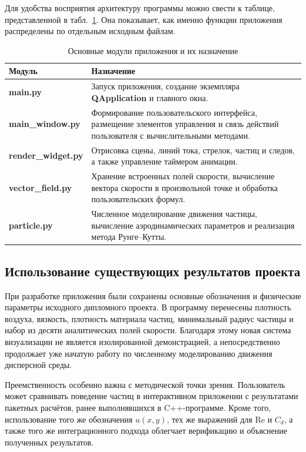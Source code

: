 \documentclass[14pt,a4paper]{extarticle}
\numberwithin{figure}{section}
\numberwithin{table}{section}
\begin{document}
Для удобства восприятия архитектуру программы можно свести к таблице,
представленной в табл.~\ref{tab:modules}. Она показывает, как именно функции
приложения распределены по отдельным исходным файлам.

\begin{table}[!htbp]
\centering
\caption{Основные модули приложения и их назначение}
\label{tab:modules}
\begin{tabular}{|p{4cm}|p{9.2cm}|}
\hline
\textbf{Модуль} & \textbf{Назначение} \\
\hline
\textbf{main.py} & Запуск приложения, создание экземпляра \textbf{QApplication} и главного окна. \\
\hline
\textbf{main\_window.py} & Формирование пользовательского интерфейса, размещение элементов управления и связь действий пользователя с вычислительными методами. \\
\hline
\textbf{render\_widget.py} & Отрисовка сцены, линий тока, стрелок, частиц и следов, а также управление таймером анимации. \\
\hline
\textbf{vector\_field.py} & Хранение встроенных полей скорости, вычисление вектора скорости в произвольной точке и обработка пользовательских формул. \\
\hline
\textbf{particle.py} & Численное моделирование движения частицы, вычисление аэродинамических параметров и реализация метода Рунге--Кутты. \\
\hline
\end{tabular}
\end{table}

\subsection{Использование существующих результатов проекта}

При разработке приложения были сохранены основные обозначения и физические
параметры исходного дипломного проекта. В программу перенесены плотность воздуха,
вязкость, плотность материала частиц, минимальный радиус частицы и набор из десяти
аналитических полей скорости. Благодаря этому новая система визуализации не
является изолированной демонстрацией, а непосредственно продолжает уже начатую
работу по численному моделированию движения дисперсной среды.

Преемственность особенно важна с методической точки зрения. Пользователь может
сравнивать поведение частиц в интерактивном приложении с результатами пакетных
расчётов, ранее выполнявшихся в C++-программе. Кроме того, использование того же
обозначения $u(x,y)$, тех же выражений для $\mathrm{Re}$ и $C_d$, а также того же
интеграционного подхода облегчает верификацию и объяснение полученных результатов.
\end{document}
